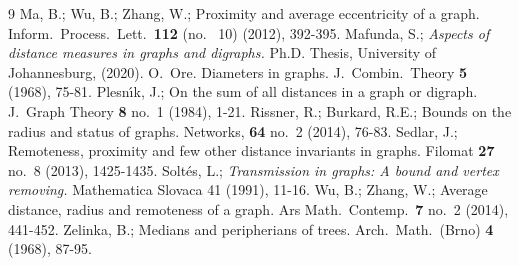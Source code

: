 \documentclass[a4paper,11pt]{article}
\begin{document}
\begin{thebibliography}{9}
 Ma, B.; Wu, B.; Zhang, W.;
     Proximity and average eccentricity of a graph.
     Inform.\ Process.\ Lett.\ {\bf 112} (no. \ 10) (2012), 392-395. 
      Mafunda, S.; \textit{Aspects of distance measures in graphs and digraphs.} Ph.D. Thesis, University of Johannesburg, (2020).
 O.\ Ore. 
   Diameters in graphs.
   J.\ Combin.\ Theory {\bf 5} (1968), 75-81.
 Plesn\'\i k, J.;
    On the sum of all distances in a graph or digraph.
    J.\ Graph Theory {\bf 8} no.\ 1 (1984), 1-21.   
 Rissner, R.; Burkard, R.E.;  
     Bounds on the radius and status of graphs. 
     Networks, {\bf 64} no.\ 2 (2014), 76-83.     
 Sedlar, J.; 
     Remoteness, proximity and few other distance invariants in graphs. 
     Filomat {\bf 27} no.\ 8 (2013), 1425-1435.   
      Solt\'{e}s, L.; \textit{Transmission in graphs: A bound and vertex removing.} Mathematica Slovaca 41 (1991), 11-16.  
 Wu, B.; Zhang, W.;
     Average distance, radius and remoteness of a graph.
     Ars Math.\ Contemp.\ {\bf 7} no.\ 2 (2014), 441-452.
     Zelinka, B.;
     Medians and peripherians of trees.
     Arch.\ Math.\ (Brno) {\bf 4} (1968), 87-95.
\end{thebibliography}
\end{document}
